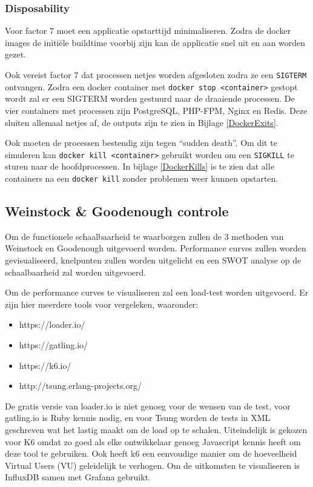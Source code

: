 \subsubsection{Disposability}
Voor factor 7 moet een applicatie opstarttijd minimaliseren. Zodra de docker images de initiële buildtime voorbij zijn kan de applicatie snel uit en aan worden gezet.

Ook vereist factor 7 dat processen netjes worden afgesloten zodra ze een \texttt{SIGTERM} ontvangen. Zodra een docker container met \texttt{docker stop <container>} gestopt wordt zal er een SIGTERM worden gestuurd naar de draaiende processen. De vier containers met processen zijn PostgreSQL, PHP-FPM, Nginx en Redis. Deze sluiten allemaal netjes af, de outputs zijn te zien in Bijlage \ref{DockerExits}.

Ook moeten de processen bestendig zijn tegen \enquote{sudden death}. Om dit te simuleren kan \texttt{docker kill <container>} gebruikt worden om een \texttt{SIGKILL} te sturen naar de hoofdprocessen. In bijlage \ref{DockerKills} is te zien dat alle containers na een \texttt{docker kill} zonder problemen weer kunnen opstarten.

\subsection{Weinstock \& Goodenough controle} \label{schaalbaarheidscontrole}
Om de functionele schaalbaarheid te waarborgen zullen de 3 methoden van Weinstock en Goodenough \parencite{OnSystemScalability} uitgevoerd worden. Performance curves zullen worden gevisualiseerd, knelpunten zullen worden uitgelicht en een SWOT analyse op de schaalbaarheid zal worden uitgevoerd.

Om de performance curves te visualiseren zal een load-test worden uitgevoerd. Er zijn hier meerdere tools voor vergeleken, waaronder:
\begin{itemize}
	\item https://loader.io/
	\item https://gatling.io/
	\item https://k6.io/
	\item http://tsung.erlang-projects.org/
\end{itemize}

De gratis versie van loader.io is niet genoeg voor de wensen van de test, voor gatling.io is Ruby kennis nodig, en voor Tsung worden de tests in XML geschreven wat het lastig maakt om de load op te schalen. Uiteindelijk is gekozen voor K6 omdat zo goed als elke ontwikkelaar genoeg Javascript kennis heeft om deze tool te gebruiken. Ook heeft k6 een eenvoudige manier om de hoeveelheid Virtual Users (VU) geleidelijk te verhogen. Om de uitkomsten te visualiseren is InfluxDB samen met Grafana gebruikt. 

